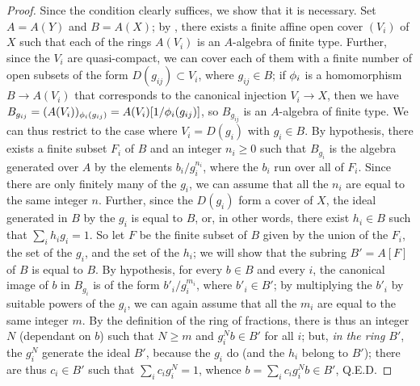 \begin{proof}
\label{proof-I.6.3.3}
Since the condition clearly suffices, we show that it is necessary.
Set $A=A(Y)$ and $B=A(X)$;
by , there exists a finite affine open cover $(V_i)$ of $X$ such that each of the rings $A(V_i)$ is an $A$-algebra of finite type.
Further, since the $V_i$ are quasi-compact, we can cover each of them with a finite number of open subsets of the form $D(g_{ij})\subset V_i$, where $g_{ij}\in B$;
if $\phi_i$ is a homomorphism $B\to A(V_i)$ that corresponds to the canonical injection $V_i\to X$, then we have $B_{g_{ij}}=(A(V_i))_{\phi_i(g_{ij})}=A(V_i)[1/\phi_i(g_{ij})]$, so $B_{g_{ij}}$ is an $A$-algebra of finite type.
We can thus restrict to the case where $V_i=D(g_i)$ with $g_i\in B$.
By hypothesis, there exists a finite subset $F_i$ of $B$ and an integer $n_i\geq0$ such that $B_{g_i}$ is the algebra generated over $A$ by the elements $b_i/g_i^{n_i}$, where the $b_i$ run over all of $F_i$.
Since there are only finitely many of the $g_i$, we can assume that all the $n_i$ are equal to the same integer $n$.
Further, since the $D(g_i)$ form a cover of $X$, the ideal generated in $B$ by the $g_i$ is equal to $B$, or, in other words, there exist $h_i\in B$ such that $\sum_i h_ig_i=1$.
So let $F$ be the finite subset of $B$ given by the union of the $F_i$, the set of the $g_i$, and the set of the $h_i$; we will show that the subring $B'=A[F]$ of $B$ is equal to $B$.
By hypothesis, for every $b\in B$ and every $i$, the canonical image of $b$ in $B_{g_i}$ is of the form $b'_i/g_i^{m_i}$, where $b'_i\in B'$;
by multiplying the $b'_i$ by suitable powers of the $g_i$, we can again assume that all the $m_i$ are equal to the same integer $m$.
By the definition of the ring of fractions, there is thus an integer $N$ (dependant on $b$) such that $N\geq m$ and $g_i^Nb\in B'$ for all $i$;
but, \emph{in the ring $B'$}, the $g_i^N$ generate the ideal $B'$, because the $g_i$ do (and the $h_i$ belong to $B'$);
there are thus $c_i\in B'$ such that $\sum_i c_ig_i^N=1$, whence $b=\sum_ic_ig_i^Nb\in B'$, Q.E.D.
\end{proof}

